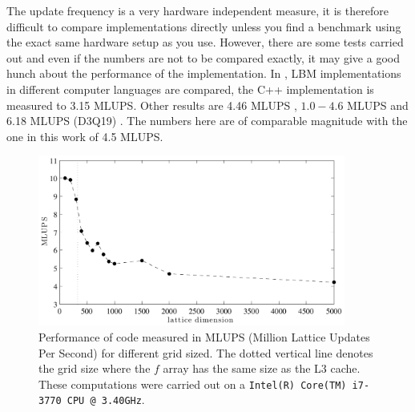 The update frequency is a very hardware independent measure, it is
therefore difficult to compare implementations directly unless you
find a benchmark using the exact same hardware setup as you
use. However, there are some tests carried out and even if the numbers
are not to be compared exactly, it may give a good hunch about the
performance of the implementation. In \cite{palabos}, LBM
implementations in different computer languages are compared, the C++
implementation is measured to 3.15 MLUPS. Other results are 4.46 MLUPS
\cite{lbm_bench_thomas}, $1.0-4.6$ MLUPS \cite{lbm_bench_mattila} and
6.18 MLUPS (D3Q19) \cite{lbm_bench_bailey}. The numbers here are of
comparable magnitude with the one in this work of 4.5 MLUPS.

\begin{figure}
\begin{center}
\includegraphics[width=0.9\textwidth]{fig/mlups.pdf}
\end{center}
\caption[Performance of code for different grid sizes.]{Performance of
  code measured in MLUPS (Million Lattice Updates Per Second) for
  different grid sized. The dotted vertical line denotes the grid size
  where the $f$ array has the same size as the L3 cache. These
  computations were carried out on a \texttt{Intel(R) Core(TM) i7-3770
    CPU @ 3.40GHz}.}
\label{fig:hpc:mlups}
\end{figure}


